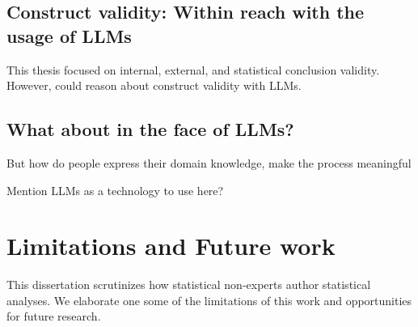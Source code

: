 \subsection{Construct validity: Within reach with the usage of LLMs}
This thesis focused on internal, external, and statistical conclusion validity. However, could reason about construct validity with LLMs.

\subsection{What about in the face of LLMs?}

But how do people express their domain knowledge, make the process meaningful

Mention LLMs as a technology to use here?

\section{Limitations and Future work} \label{sec:futureWork}

This dissertation scrutinizes how statistical non-experts author statistical
analyses. We elaborate one some of the limitations of this work and
opportunities for future research. 

\begin{comment}
    Improving statistical analysis authoring opens up questions in
addressing core issues in statistics, end-user software engineering, programming
language design, which we hope will be additional directions other pursue. 

Some themes that emerge: 
- Support for after statistical modeling -- what do these mean? (interpretation) --> What to do next? / what would help me answer my research question? (modeling-testing) --> 
- How to capture and use these consequences into next phases of the lifecycle? 
- How could all these improve science and make data analysis more robust? 
\end{comment}

\begin{comment}
As demonstrations of how better programming abstractions and automated reasoning
can enable statistical non-experts to author analyses and improve the quality of
statistical analysis, Tea and Tisane...

Tea and Tisane have demonstrated the benefit of using higher levels of
abstraction focused on conceptual knowledge expression and reasoning. They
primarily orient the question of design...They can serve as building blocks for START HERE

Has this dissertation lost its way? Further re-orienting towards what users *really* want: to understand their domain
Push further in directions this work orients us 
- more support for understanding results, especially when some questions may not be answerable with the data/how it was collected
- knowing how robust the results are --> why not just multiverse everything?
**how do we resolve and come out from under the tyranny of false positive rates fear
\end{comment}

